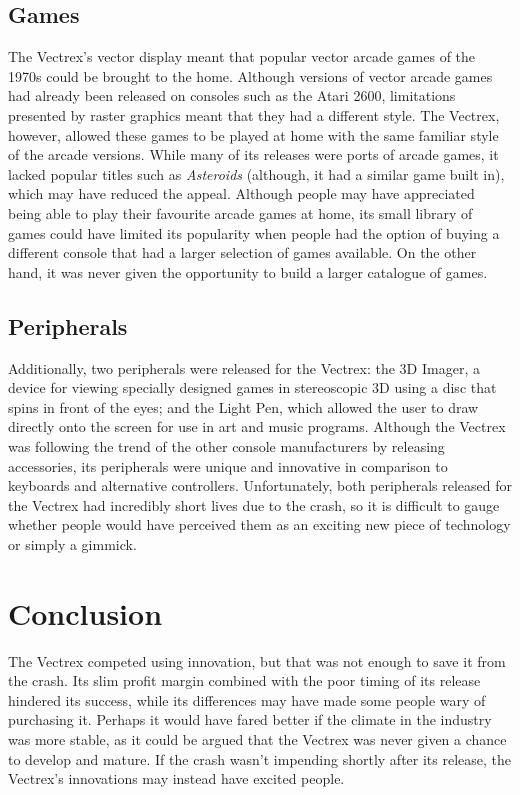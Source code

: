 \documentclass{scrartcl}
\begin{document}
\subsection*{Games}
The Vectrex's vector display meant that popular vector arcade games of the 1970s could be brought to the home. Although versions of vector arcade games had already been released on consoles such as the Atari 2600, limitations presented by raster graphics meant that they had a different style\cite{montfort:random}. The Vectrex, however, allowed these games to be played at home with the same familiar style of the arcade versions. While many of its releases were ports of arcade games, it lacked popular titles such as \textit{Asteroids} (although, it had a similar game built in)\cite{baer:supercade}, which may have reduced the appeal. Although people may have appreciated being able to play their favourite arcade games at home, its small library of games could have limited its popularity when people had the option of buying a different console that had a larger selection of games available. On the other hand, it was never given the opportunity to build a larger catalogue of games. 


\subsection*{Peripherals} 
Additionally, two peripherals were released for the Vectrex: the 3D Imager, a device for viewing specially designed games in stereoscopic 3D using a disc that spins in front of the eyes\cite{zachara:stereo}; and the Light Pen, which allowed the user to draw directly onto the screen for use in art and music programs. Although the Vectrex was following the trend of the other console manufacturers by releasing accessories, its peripherals were unique and innovative in comparison to keyboards and alternative controllers\cite{montfort:beam}. Unfortunately, both peripherals released for the Vectrex had incredibly short lives due to the crash, so it is difficult to gauge whether people would have perceived them as an exciting new piece of technology or simply a gimmick.



\section*{Conclusion}
The Vectrex competed using innovation, but that was not enough to save it from the crash. Its slim profit margin combined with the poor timing of its release hindered its success, while its differences may have made some people wary of purchasing it. Perhaps it would have fared better if the climate in the industry was more stable, as it could be argued that the Vectrex was never given a chance to develop and mature. If the crash wasn't impending shortly after its release, the Vectrex's innovations may instead have excited people.




\end{document}
